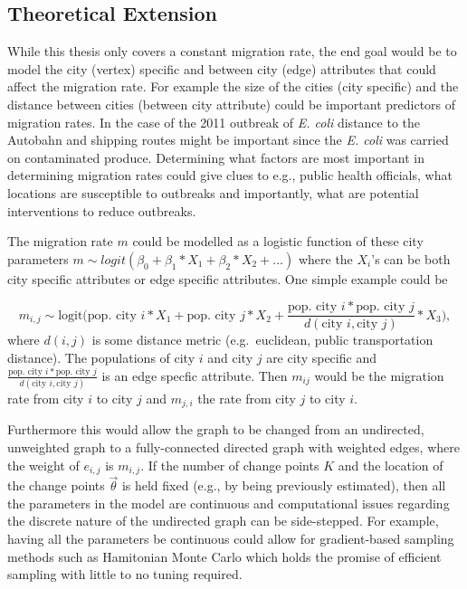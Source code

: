 \documentclass[11pt,a4paper]{article}
\numberwithin{equation}{section}
\begin{document}
\hypertarget{theoretical-extension}{%
\subsection{Theoretical Extension}\label{theoretical-extension}}

While this thesis only covers a constant migration rate, the end goal
would be to model the city (vertex) specific and between city (edge)
attributes that could affect the migration rate. For example the size of
the cities (city specific) and the distance between cities (between city
attribute) could be important predictors of migration rates. In the case
of the 2011 outbreak of \emph{E. coli} distance to the Autobahn and
shipping routes might be important since the \emph{E. coli} was carried
on contaminated produce. Determining what factors are most important in
determining migration rates could give clues to e.g., public health
officials, what locations are susceptible to outbreaks and importantly,
what are potential interventions to reduce outbreaks.

The migration rate \(m\) could be modelled as a logistic function of
these city parameters
\(m \sim logit(\beta_0 + \beta_1*X_1 + \beta_2*X_2 + \dots)\) where the
\(X_i\)'s can be both city specific attributes or edge specific
attributes. One simple example could be

\[m_{i,j} \sim \text{logit}\big(\text{pop. city }i*X_1 + \text{pop. city } j*X_2 + \frac{\text{pop. city }i*\text{pop. city }j}{d(\text{city }i, \text{city }j)}*X_3\big), \]
where \(d(i,j)\) is some distance metric (e.g.~euclidean, public
transportation distance). The populations of city \(i\) and city \(j\)
are city specific and
\(\frac{\text{pop. city }i*\text{pop. city }j}{d(\text{city }i, \text{city }j)}\)
is an edge specfic attribute. Then \(m_{ij}\) would be the migration
rate from city \(i\) to city \(j\) and \(m_{j,i}\) the rate from city
\(j\) to city \(i\).

Furthermore this would allow the graph to be changed from an undirected,
unweighted graph to a fully-connected directed graph with weighted
edges, where the weight of \(e_{i,j}\) is \(m_{i,j}\). If the number of
change points \(K\) and the location of the change points
\(\vec{\theta}\) is held fixed (e.g., by being previously estimated),
then all the parameters in the model are continuous and computational
issues regarding the discrete nature of the undirected graph can be
side-stepped. For example, having all the parameters be continuous could
allow for gradient-based sampling methods such as Hamitonian Monte Carlo
which holds the promise of efficient sampling with little to no tuning
required.
\end{document}
